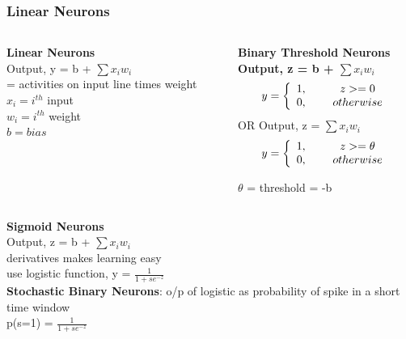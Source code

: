 \documentclass{beamer}
\begin{document}
\begin{frame}[allowframebreaks]\frametitle{Linear Neurons}
	\begin{columns}
		\begin{column}{0.4\textwidth}
			\textbf{Linear Neurons}\\
			Output, y = b + $\sum x_i w_i$\\
			= activities on input line times weight\\
			$x_i = i^{th}$ input\\
			$w_i = i^{th}$ weight\\
			$b = bias$\\
			
		\end{column}
		\begin{column}{0.7\textwidth}
			\textbf{Binary Threshold Neurons}\\
			\textbf{Output, z = b + $\sum x_i w_i$}
			\begin{align}
			y = \left\{ \begin{array}{cc} 
			1, & \hspace{5mm} z >=0 \\
			0, & \hspace{5mm} otherwise \\
			\end{array} \right.
			\end{align}
			OR Output, z = $\sum x_i w_i$\\
			\begin{align}
			y = \left\{ \begin{array}{cc} 
			1, & \hspace{5mm} z >=\theta \\
			0, & \hspace{5mm} otherwise \\
			\end{array} \right.
			\end{align}

			$\theta$ = threshold = -b
			
		\end{column}
		\end{columns}

	\begin{columns}

		\begin{column}{0.35\textwidth}
			\textbf{Sigmoid Neurons}\\
			Output, z = b + $\sum x_i w_i$\\
			derivatives makes learning easy\\
			use logistic function, y = $\frac{1}{1+se^{-z}}$\\
			\textbf{Stochastic Binary Neurons}: o/p of logistic as probability of spike in a short time window\\
			p(s=1) = $\frac{1}{1+se^{-z}}$\\
			

\end{column}
\end{columns}
\end{frame}
\end{document}
